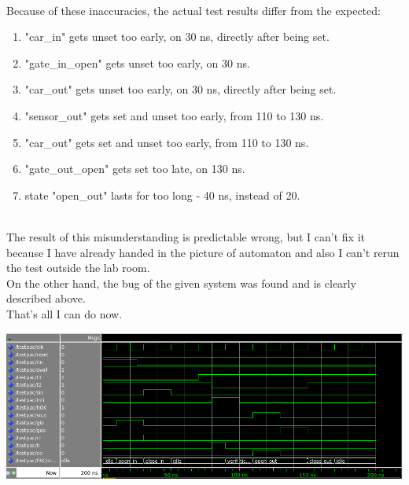 \documentclass{article}
\begin{document}
	\ \\
	Because of these inaccuracies, the actual test results differ from the expected:
	\begin{enumerate}[nosep]
		\item "car\_in" gets unset too early, on 30 ns, directly after being set.
		\item "gate\_in\_open" gets unset too early, on 30 ns.
		\item "car\_out" gets unset too early, on 30 ns, directly after being set.
		\item "sensor\_out" gets set and unset too early, from 110 to 130 ns.
		\item "car\_out" gets set and unset too early, from 110 to 130 ns.
		\item "gate\_out\_open" gets set too late, on 130 ns.
		\item state "open\_out" lasts for too long - 40 ns, instead of 20.
	\end{enumerate}
	\ \\
	The result of this misunderstanding is predictable wrong, but I can't fix it because I have already handed in the picture of automaton and also I can't rerun the test outside the lab room. \\
	On the other hand, the bug of the given system was found and is clearly described above. \\
	That's all I can do now.

	\includegraphics[width=\textwidth]{test.png}
\end{document}
